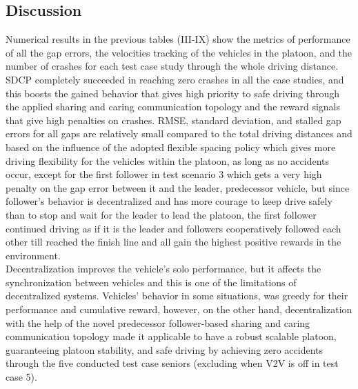 \subsection{Discussion}
Numerical results in the previous tables (III-IX) show the metrics of performance of all the gap errors, the velocities tracking of the vehicles in the platoon, and the number of crashes for each test case study through the whole driving distance.\\
SDCP completely succeeded in reaching zero crashes in all the case studies, and this boosts the gained behavior that gives high priority to safe driving through the applied sharing and caring communication topology and the reward signals that give high penalties on crashes. RMSE, standard deviation, and stalled gap errors for all gaps are relatively small compared to the total driving distances and based on the influence of the adopted flexible spacing policy which gives more driving flexibility for the vehicles within the platoon, as long as no accidents occur, except for the first follower in test scenario 3 which gets a very high penalty on the gap error between it and the leader, predecessor vehicle, but since follower's behavior is decentralized and has more courage to keep drive safely than to stop and wait for the leader to lead the platoon, the first follower continued driving as if it is the leader and followers cooperatively followed each other till reached the finish line and all gain the highest positive rewards in the environment.\\
Decentralization improves the vehicle's solo performance, but it affects the synchronization between vehicles and this is one of the limitations of decentralized systems. Vehicles' behavior in some situations, was greedy for their performance and cumulative reward, however, on the other hand, decentralization with the help of the novel predecessor follower-based sharing and caring communication topology made it applicable to have a robust scalable platoon, guaranteeing platoon stability, and safe driving by achieving zero accidents through the five conducted test case seniors (excluding when V2V is off in test case 5).



